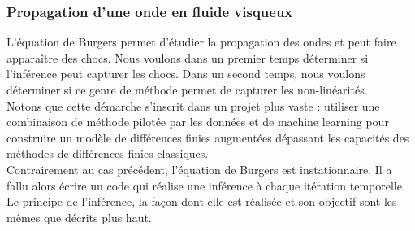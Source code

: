 \documentclass[a4paper,12pt]{article}
\newcommand{\bmap}{\beta_{\text{MAP}}}
\newcommand\bk{\color{black}}
\newcommand\dsb{\color{dsb}}
\numberwithin{equation}{section} %
\begin{document}


 
 
\dsb \subsubsection{Propagation d'une onde en fluide visqueux} \bk
L'équation de Burgers permet d'étudier la propagation des ondes et peut faire apparaître des chocs. Nous voulons dans un premier temps déterminer si l'inférence peut capturer les chocs. Dans un second temps, nous voulons déterminer si ce genre de méthode permet de capturer les non-linéarités. \\
Notons que cette démarche s'inscrit dans un projet plus vaste : utiliser une combinaison de méthode pilotée par les données et de machine learning pour construire un modèle de différences finies augmentées dépassant les capacités des méthodes de différences finies classiques.\\

\noindent Contrairement au cas précédent, l'équation de Burgers est instationnaire. Il a fallu alors écrire un code qui réalise une inférence à chaque itération temporelle. Le principe de l'inférence, la façon dont elle est réalisée et son objectif sont les mêmes que décrits plus haut.\\
\end{document}
